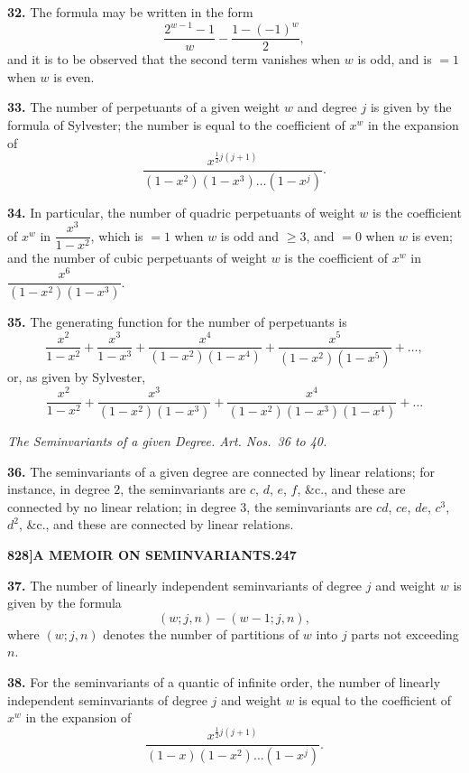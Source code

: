 \documentclass[11pt,a4paper]{book}
\begin{document}
\noindent\textbf{32.} The formula may be written in the form
\[
\frac{2^{w-1} - 1}{w} - \frac{1 - (-1)^w}{2},
\]
and it is to be observed that the second term vanishes when $w$ is odd, and is $= 1$ when $w$ is even.

\noindent\textbf{33.} The number of perpetuants of a given weight $w$ and degree $j$ is given by the formula of Sylvester; the number is equal to the coefficient of $x^w$ in the expansion of
\[
\frac{x^{\frac{1}{2}j(j+1)}}{(1-x^2)(1-x^3)\dots(1-x^j)}.
\]

\noindent\textbf{34.} In particular, the number of quadric perpetuants of weight $w$ is the coefficient of $x^w$ in $\dfrac{x^3}{1-x^2}$, which is $= 1$ when $w$ is odd and $\geq 3$, and $= 0$ when $w$ is even; and the number of cubic perpetuants of weight $w$ is the coefficient of $x^w$ in $\dfrac{x^6}{(1-x^2)(1-x^3)}$.

\noindent\textbf{35.} The generating function for the number of perpetuants is
\[
\frac{x^2}{1-x^2} + \frac{x^3}{1-x^3} + \frac{x^4}{(1-x^2)(1-x^4)} + \frac{x^5}{(1-x^2)(1-x^5)} + \dots,
\]
or, as given by Sylvester,
\[
\frac{x^2}{1-x^2} + \frac{x^3}{(1-x^2)(1-x^3)} + \frac{x^4}{(1-x^2)(1-x^3)(1-x^4)} + \dots
\]

\begin{center}
\textit{The Seminvariants of a given Degree. Art. Nos.~36 to 40.}
\end{center}

\noindent\textbf{36.} The seminvariants of a given degree are connected by linear relations; for instance, in degree $2$, the seminvariants are $c$, $d$, $e$, $f$, \&c., and these are connected by no linear relation; in degree $3$, the seminvariants are $cd$, $ce$, $de$, $c^3$, $d^2$, \&c., and these are connected by linear relations.

\newpage
\setcounter{page}{247}

\noindent\textbf{828]}\hfill\textbf{A MEMOIR ON SEMINVARIANTS.}\hfill\textbf{247}

\bigskip

\noindent\textbf{37.} The number of linearly independent seminvariants of degree $j$ and weight $w$ is given by the formula
\[
(w; j, n) - (w-1; j, n),
\]
where $(w; j, n)$ denotes the number of partitions of $w$ into $j$ parts not exceeding $n$.

\noindent\textbf{38.} For the seminvariants of a quantic of infinite order, the number of linearly independent seminvariants of degree $j$ and weight $w$ is equal to the coefficient of $x^w$ in the expansion of
\[
\frac{x^{\frac{1}{2}j(j+1)}}{(1-x)(1-x^2)\dots(1-x^j)}.
\]
\end{document}
